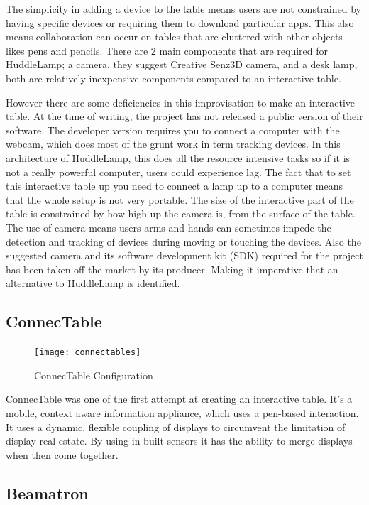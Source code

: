 The simplicity in adding a device to the table means users are not
constrained by having specific devices or requiring them to download
particular apps. This also means collaboration can occur on tables
that are cluttered with other objects likes pens and pencils. There
are 2 main components that are required for HuddleLamp;
a camera, they suggest Creative Senz3D camera, and a desk lamp, both
are relatively inexpensive components compared to an interactive table.

However there are some deficiencies in this improvisation to make
an interactive table. At the time of writing, the project has not
released a public version of their software. The developer
version requires you to connect a computer with the webcam, which
does most of the grunt work in term tracking devices. In this architecture
of HuddleLamp, this does all the resource intensive tasks so if it is
not a really powerful computer, users could experience lag. The fact
that to set this interactive table up you need to connect a lamp up
to a computer means that the whole setup is not very portable. The
size of the interactive part of the table is constrained by how high
up the camera is, from the surface of the table. The use of camera
means users arms and hands can sometimes impede the
detection and tracking of devices during moving or touching the devices.
Also the suggested camera and its software development kit (SDK) required
for the project has been taken off the market by its producer. Making
it imperative that an alternative to HuddleLamp is identified.


\subsection{ConnecTable}

\begin{figure}[H]
\texttt{[image: connectables]}

\protect\caption{ConnecTable Configuration}
\end{figure}


ConnecTable was one of the first attempt at creating an interactive
table. It\textquoteright s a mobile, context aware information appliance,
which uses a pen-based interaction. It uses a dynamic, flexible coupling
of displays to circumvent the limitation of display real estate. By
using in built sensors it has the ability to merge displays when then
come together. 


\subsection{Beamatron}

